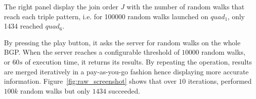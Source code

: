  The right panel display the join order $J$ with the number of random
 walks that reach each triple pattern, i.e. for 100000 random walks
 launched on $quad_1$, only 1434 reached $quad_6$.

 By pressing the play button, it asks the server for random walks on
 the whole BGP. When the server reaches a configurable threshold of
 $10 000$ random walks, or $60s$ of execution time, it returns its
 results. By repeating the operation, results are merged iteratively
 in a pay-as-you-go fashion hence displaying more accurate
 information. Figure~\ref{fig:raw_screenshot} shows that over $10$
 iterations, \NAME performed $100k$ random walks but only $1434$
 succeeded.






